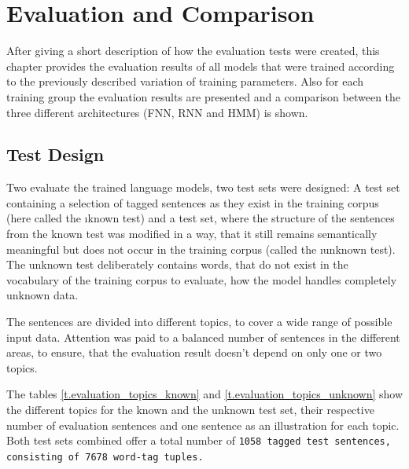 \chapter{Evaluation and Comparison}\label{c.evaluation}
After giving a short description of how the evaluation tests were created, this chapter provides the evaluation results of all models that were trained according to the previously described variation of training parameters. Also for each training group the evaluation results are presented and a comparison between the three different architectures (FNN, RNN and HMM) is shown.

\section{Test Design}\label{c.evaluation.test}
Two evaluate the trained language models, two test sets were designed: A test set containing a selection of tagged sentences as they exist in the training corpus (here called the \i{known test}) and a test set, where the structure of the sentences from the known test was modified in a way, that it still remains semantically meaningful but does not occur in the training corpus (called the \i{unknown test}). The unknown test deliberately contains words, that do not exist in the vocabulary of the training corpus to evaluate, how the model handles completely unknown data.

The sentences are divided into different topics, to cover a wide range of possible input data. Attention was paid to a balanced number of sentences in the different areas, to ensure, that the evaluation result doesn't depend on only one or two topics.

The tables \ref{t.evaluation_topics_known} and \ref{t.evaluation_topics_unknown} show the different topics for the known and the unknown test set, their respective number of evaluation sentences and one sentence as an illustration for each topic. Both test sets combined offer a total number of \tt{1058} tagged test sentences, consisting of \tt{7678} word-tag tuples.

